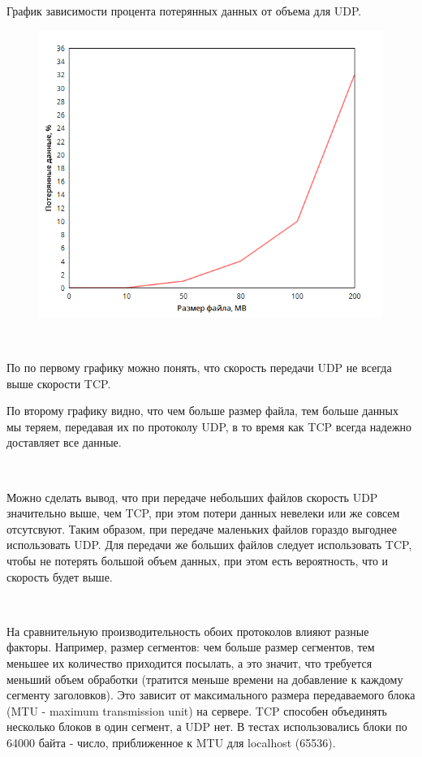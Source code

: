 \documentclass{article}
\begin{document}
График зависимости процента потерянных данных от объема для UDP.

\begin{figure}[h!]
\includegraphics[scale=0.5]{7}
\end{figure}

~\

По по первому графику можно понять, что скорость передачи UDP не всегда выше скорости TCP.

По второму графику видно, что чем больше размер файла, тем больше данных мы теряем, передавая их по протоколу UDP, в то время как TCP всегда надежно доставляет все данные.

~\

Можно сделать вывод, что при передаче небольших файлов скорость UDP значительно выше, чем TCP, при этом потери данных невелеки или же совсем отсутсвуют. Таким образом, при передаче маленьких файлов гораздо выгоднее использовать UDP.
Для передачи же больших файлов следует использовать TCP, чтобы не потерять большой объем данных, при этом есть вероятность, что и скорость будет выше.

~\

На сравнительную производительность обо­их протоколов влияют разные факторы. Например, размер сегментов: чем больше размер сегментов, тем меньшее их количество приходится посылать, а это значит, что требуется меньший объем обработки (тратится меньше времени на добавление к каждому сегменту заголовков). Это зависит от максимального размера передаваемого блока (MTU - maximum transmission unit) на сервере. TCP способен объединять несколько блоков в один сегмент, а UDP нет.
В тестах использовались блоки по 64000 байта - число, приближенное к MTU для localhost (65536).
\end{document}

